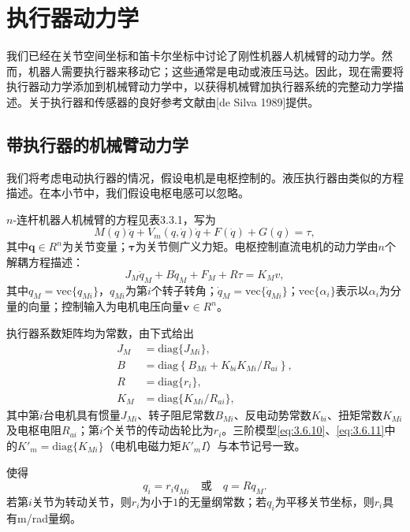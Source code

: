 \documentclass[12pt,a4paper]{ctexart}
\begin{document}
\section{执行器动力学}

我们已经在关节空间坐标和笛卡尔坐标中讨论了刚性机器人机械臂的动力学。然而，机器人需要执行器来移动它；这些通常是电动或液压马达。因此，现在需要将执行器动力学添加到机械臂动力学中，以获得机械臂加执行器系统的完整动力学描述。关于执行器和传感器的良好参考文献由[de Silva 1989]提供。

\subsection{带执行器的机械臂动力学}

我们将考虑电动执行器的情况，假设电机是电枢控制的。液压执行器由类似的方程描述。在本小节中，我们假设电枢电感可以忽略。

$n$-连杆机器人机械臂的方程见表3.3.1，写为
\begin{equation}\label{eq:3.6.1}
M(q)\ddot{q} + V_m(q,\dot{q})\dot{q} + F(\dot{q}) + G(q) = \tau,
\end{equation}
其中$\bm{q}\in R^n$为关节变量；$\bm{\tau}$为关节侧广义力矩。电枢控制直流电机的动力学由$n$个解耦方程描述：
\begin{equation}\label{eq:3.6.2}
J_M\ddot{q}_M + B\dot{q}_M + F_M + R\tau = K_M v,
\end{equation}
其中$q_M=\text{vec}\{q_{Mi}\}$，$q_{Mi}$为第$i$个转子转角；$\dot{q}_M=\text{vec}\{\dot{q}_{Mi}\}$；$\text{vec}\{\alpha_i\}$表示以$\alpha_i$为分量的向量；控制输入为电机电压向量$\bm{v}\in R^n$。

执行器系数矩阵均为常数，由下式给出
\begin{equation}\label{eq:3.6.3}
\begin{aligned}
J_M &= \mathrm{diag}\{J_{Mi}\}, \\
B &= \mathrm{diag}\left\{B_{Mi} + K_{bi}K_{Mi}/R_{ai}\right\}, \\
R &= \mathrm{diag}\{r_i\}, \\
K_M &= \mathrm{diag}\{K_{Mi}/R_{ai}\},
\end{aligned}
\end{equation}
其中第$i$台电机具有惯量$J_{Mi}$、转子阻尼常数$B_{Mi}$、反电动势常数$K_{bi}$、扭矩常数$K_{Mi}$及电枢电阻$R_{ai}$；第$i$个关节的传动齿轮比为$r_i$。三阶模型\eqref{eq:3.6.10}、\eqref{eq:3.6.11}中的$K'_m=\mathrm{diag}\{K_{Mi}\}$（电机电磁力矩$K'_m I$）与本节记号一致。

使得
\begin{equation}\label{eq:3.6.4}
q_i = r_i q_{Mi} \quad \text{或} \quad q = R q_M.
\end{equation}
若第$i$关节为转动关节，则$r_i$为小于$1$的无量纲常数；若$q_i$为平移关节坐标，则$r_i$具有m/rad量纲。
\end{document}
